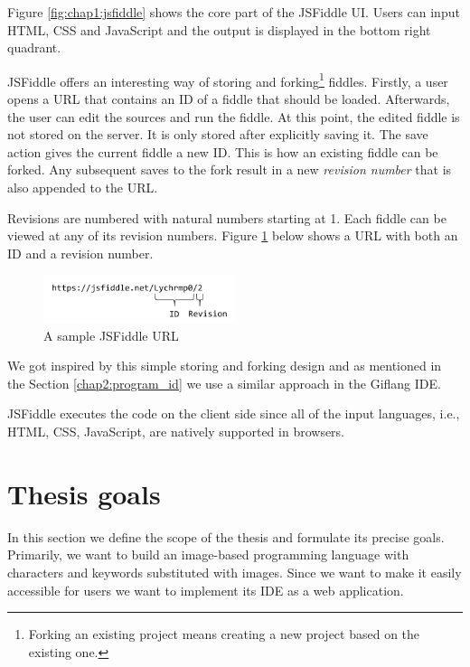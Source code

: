 Figure \ref{fig:chap1:jsfiddle} shows the core part of the JSFiddle UI. Users can input HTML, CSS and JavaScript and the output is displayed in the
bottom right quadrant.

JSFiddle offers an interesting way of storing and forking\footnote{Forking an existing project means creating a new project based on the existing one.}
fiddles. Firstly, a user opens a URL that contains an ID of a fiddle that should be loaded. Afterwards, the user can edit the sources and run the fiddle.
At this point, the edited fiddle is not stored on the server. It is only stored after explicitly saving it. The save action gives the current fiddle a new ID.
This is how an existing fiddle can be forked. Any subsequent saves to the fork result in a new \emph{revision number} that is also appended to the URL.

Revisions are numbered with natural numbers starting at 1. Each fiddle can be viewed at any of its revision numbers. Figure \ref{fig:chap1:jsfiddle_url}
below shows a URL with both an ID and a revision number.
\begin{figure}[!hbt]
    \centering
	\includegraphics[width=0.5\textwidth]{../img/jsfiddle_url}
	\caption{A sample JSFiddle URL}
	\label{fig:chap1:jsfiddle_url}
\end{figure}

We got inspired by this simple storing and forking design and as mentioned in the Section \ref{chap2:program_id} we use a similar approach in the Giflang IDE.

JSFiddle executes the code on the client side since all of the input languages, i.e., HTML, CSS, JavaScript, are natively supported in browsers.

\section{Thesis goals}
\label{chap1:thesis_goals}
In this section we define the scope of the thesis and formulate its precise goals. Primarily, we want to build an image-based programming language
with characters and keywords substituted with images. Since we want to make it easily accessible for users we want to implement its
IDE as a web application.

